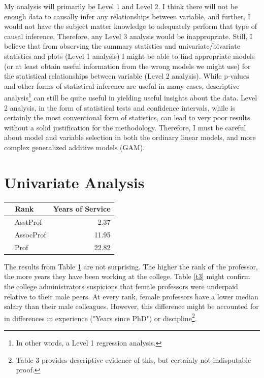 \documentclass{article}
\begin{document}
My analysis will primarily be Level 1 and Level 2. I think there will not be enough data to causally infer any relationships between variable, and further, I would not have the subject matter knowledge to adequately perform that type of causal inference. Therefore, any Level 3 analysis would be inappropriate. Still, I believe that from observing the summary statistics and univariate/bivariate statistics and plots (Level 1 analysis) I might be able to find appropriate models (or at least obtain useful information from the wrong models we might use) for the statistical relationships between variable (Level 2 analysis). While p-values and other forms of statistical inference are useful in many cases, descriptive analysis\footnote{In other words, a Level 1 regression analysis.} can still be quite useful in yielding useful insights about the data. Level 2 analysis, in the form of statistical tests and confidence intervals, while is certainly the most conventional form of statistics, can lead to very poor results without a solid justification for the methodology. Therefore, I must be careful about model and variable selection in both the ordinary linear models, and more complex generalized additive models (GAM).

\section{Univariate Analysis}

\begin{table}[ht]
\centering
{} \label{t2} 
\begin{tabular}{rlr}
  \hline
 & Rank & Years of Service \\ 
  \hline
 & AsstProf & 2.37 \\ 
  & AssocProf & 11.95 \\ 
   & Prof & 22.82 \\ 
   \hline
\end{tabular}
\end{table}

The results from Table \ref{t2} are not surprising. The higher the rank of the professor, the more years they have been working at the college. Table \ref{t3} might confirm the college administrators suspicions that female professors were underpaid relative to their male peers. At every rank, female professors have a lower median salary than their male colleagues. However, this difference might be accounted for in differences in experience ("Years since PhD") or discipline\footnote{Table 3 provides descriptive evidence of this, but certainly not indisputable proof.}.
\end{document}
